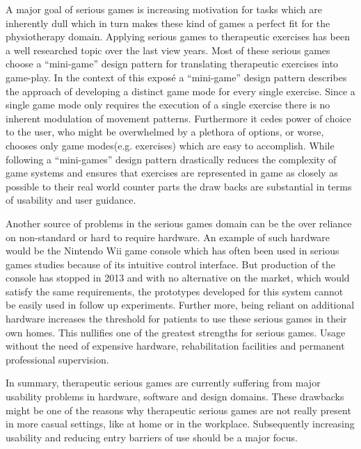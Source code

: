 A major goal of serious games is increasing motivation for tasks which are inherently dull which in turn makes these kind of games a perfect fit for the physiotherapy domain.
Applying serious games to therapeutic exercises has been a well researched topic over the last view years\cite{lohse2014virtual}\cite{wouters2013meta}\cite{gorvsivc2017competitive}. 
Most of these serious games choose a “mini-game” design pattern for translating therapeutic exercises into game-play. 
In the context of this exposé  a “mini-game” design pattern describes the approach of developing a distinct game mode for every single exercise. 
Since a single game mode only requires the execution of a single exercise there is no inherent modulation of movement patterns. 
Furthermore it cedes power of choice to the user, who might be overwhelmed by a plethora of options, or worse, chooses only game modes(e.g. exercises) which are easy to accomplish. 
While following a “mini-games” design pattern drastically reduces the complexity of game systems and ensures that exercises are represented in game as closely as possible to their real world counter parts the draw backs are substantial in terms of usability and user guidance.

Another source of problems in the serious games domain can be the over reliance on non-standard or hard to require hardware\cite{batista2019farmyo}.
An example of such hardware would be the Nintendo Wii game console which has often been used in serious games studies because of its intuitive control interface\cite{leder2008nintendo}. 
But production of the console has stopped in 2013 and with no alternative on the market, which would satisfy the same requirements, the prototypes developed for this system cannot be easily used in follow up experiments. 
Further more, being reliant on additional hardware increases the threshold for patients to use these serious games in their own homes\cite{wiemeyer2012serious}. 
This nullifies one of the greatest strengths for serious games. 
Usage without the need of expensive hardware, rehabilitation facilities and permanent professional supervision.

In summary, therapeutic serious games are currently suffering from major usability problems in hardware, software and design domains.
These drawbacks might be one of the reasons why therapeutic serious games are not really present in more casual settings, like at home or in the workplace.
Subsequently increasing usability and reducing entry barriers of use should be a major focus.


